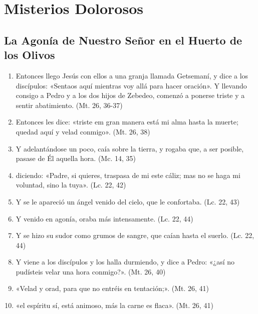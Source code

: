 \documentclass[a4paper,11pt]{article}
\begin{document}
    \newpage
        
  \section*{\hfil Misterios Dolorosos \hfil}
    
    \subsection*{\hfil La Agonía de Nuestro Señor en el Huerto de los Olivos \hfil}
      
      \begin{enumerate}

        \item Entonces llego Jesús con ellos a una granja llamada Getsemaní, y dice a los discípulos: «Sentaos aquí mientras voy allá para hacer oración». 
        Y llevando consigo a Pedro y a los dos hijos de Zebedeo, comenzó a ponerse triste y a sentir abatimiento. (Mt. 26, 36-37)

        \item Entonces les dice: «triste em gran manera está mi alma hasta la muerte; quedad aquí y velad conmigo». (Mt. 26, 38)

        \item Y adelantándose un poco, caía sobre la tierra, y rogaba que, a ser posible, pasase de Él aquella hora. (Mc. 14, 35)

        \item diciendo: «Padre, si quieres, traspasa de mi este cáliz; mas no se haga mi voluntad, sino la tuya». (Lc. 22, 42)

        \item Y se le apareció un ángel venido del cielo, que le confortaba. (Lc. 22, 43)

        \item Y venido en agonía, oraba más intensamente. (Lc. 22, 44)

        \item Y se hizo su sudor como grumos de sangre, que caían hasta el suerlo. (Lc. 22, 44)

        \item Y viene a los discípulos y los halla durmiendo, y dice a Pedro: «¿así no pudísteis velar una hora conmigo?». (Mt. 26, 40)

        \item «Velad y orad, para que no entréis en tentación;». (Mt. 26, 41)

        \item «el espíritu sí, está animoso, más la carne es flaca». (Mt. 26, 41)

      \end{enumerate}
\end{document}
